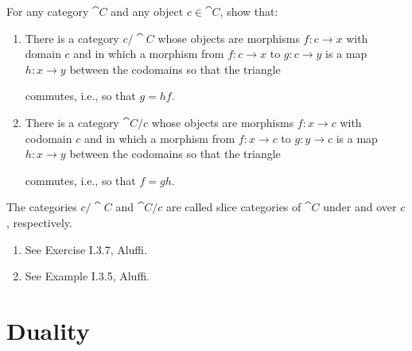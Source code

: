 \documentclass[notes,tikz]{agony}
\begin{document}
\begin{xca}
  For any category $\cat C$ and any object $c \in \cat C$, show that:
  \begin{enumerate}
    \item There is a category $c/\cat C$ whose objects are morphisms
          $f : c \to x$ with domain $c$ and
          in which a morphism from $f : c \to x$ to $g : c \to y$
          is a map $h : x \to y$ between the codomains so that the triangle
          \begin{center}
          \end{center}
          commutes, i.e., so that $g = hf$.
    \item There is a category $\cat C/c$ whose objects are morphisms
          $f : x \to c$ with codomain $c$ and
          in which a morphism from $f : x \to c$ to $g : y \to c$
          is a map $h : x \to y$ between the codomains so that the triangle
          \begin{center}
          \end{center}
          commutes, i.e., so that $f = gh$.
  \end{enumerate}
  The categories $c/\cat C$ and $\cat C/c$ are called slice categories of $\cat C$ under and over $c$, respectively.
\end{xca}
\begin{enumerate}
  \item See Exercise I.3.7, Aluffi.
  \item See Example I.3.5, Aluffi.
\end{enumerate}

\section{Duality}
\end{document}
